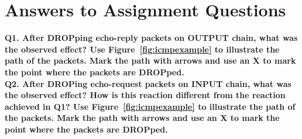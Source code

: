 \section{Answers to Assignment Questions}

\noindent \textbf{Q1. After DROPping echo-reply packets on OUTPUT chain, what 
was the observed effect? Use Figure~\ref{fig:icmpexample} to illustrate the 
path of the packets. Mark the path with arrows and use an X to mark the point 
where the packets are DROPped.}
~\ \\

\noindent \textbf{Q2. After DROPing echo-request packets on INPUT chain, what
was the observed effect? How is this reaction different from the reaction
achieved in Q1? Use Figure~\ref{fig:icmpexample} to illustrate the path of 
the
packets. Mark the path with arrows and use an X to mark the point where the
packets are DROPped.}
~\ \\

